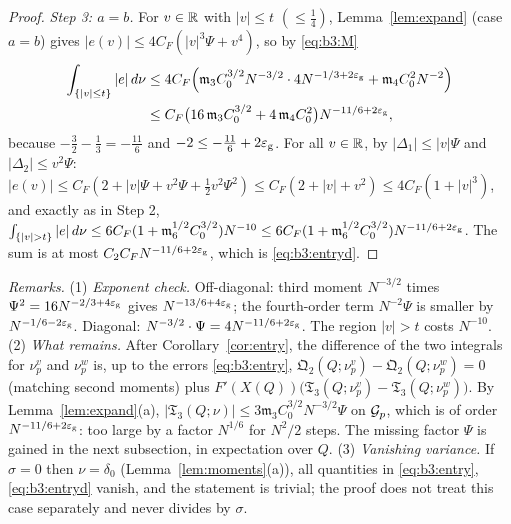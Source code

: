 \begin{proof}
\emph{Step 3: $a=b$.} For $v\in\mathbb{R}$ with $|v|\le t$ $(\le\frac14)$, Lemma~\ref{lem:expand} (case $a=b$) gives $|e(v)|\le4C_F(|v|^3\Psi+v^4)$, so by \eqref{eq:b3:M}
\begin{align*}
\int_{\{|v|\le t\}}|e|\,d\nu&\le4C_F\Big(\mathfrak m_3C_0^{3/2}N^{-3/2}\cdot4N^{-1/3+2\varepsilon_{\mathrm g}}+\mathfrak m_4C_0^2N^{-2}\Big)\\
&\le C_F\big(16\,\mathfrak m_3C_0^{3/2}+4\,\mathfrak m_4C_0^2\big)N^{-11/6+2\varepsilon_{\mathrm g}},
\end{align*}
because $-\frac32-\frac13=-\frac{11}6$ and $-2\le-\frac{11}6+2\varepsilon_{\mathrm g}$. For all $v\in\mathbb{R}$, by $|\Delta_1|\le|v|\Psi$ and $|\Delta_2|\le v^2\Psi$:
$|e(v)|\le C_F(2+|v|\Psi+v^2\Psi+\frac12v^2\Psi^2)\le C_F(2+|v|+v^2)\le4C_F(1+|v|^3)$, and exactly as in Step 2,
$\int_{\{|v|>t\}}|e|\,d\nu\le6C_F(1+\mathfrak m_6^{1/2}C_0^{3/2})N^{-10}\le6C_F(1+\mathfrak m_6^{1/2}C_0^{3/2})N^{-11/6+2\eg}$. The sum is at most $C_2C_FN^{-11/6+2\varepsilon_{\mathrm g}}$, which is \eqref{eq:b3:entryd}.
\end{proof}

\noindent\emph{Remarks.} (1) \emph{Exponent check.} Off-diagonal: third moment $N^{-3/2}$ times $\Psi^2=16N^{-2/3+4\varepsilon_{\mathrm g}}$ gives $N^{-13/6+4\varepsilon_{\mathrm g}}$; the fourth-order term $N^{-2}\Psi$
is smaller by $N^{-1/6-2\varepsilon_{\mathrm g}}$. Diagonal: $N^{-3/2}\cdot\Psi=4N^{-11/6+2\varepsilon_{\mathrm g}}$. The region $|v|>t$ costs $N^{-10}$.
(2) \emph{What remains.} After Corollary~\ref{cor:entry}, the difference of the two integrals for $\nu^v_p$ and $\nu^w_p$ is, up to the errors \eqref{eq:b3:entry},
$\mathfrak Q_2(Q;\nu^v_p)-\mathfrak Q_2(Q;\nu^w_p)=0$ (matching second moments) plus $F'(X(Q))\big(\mathfrak T_3(Q;\nu^v_p)-\mathfrak T_3(Q;\nu^w_p)\big)$. By Lemma~\ref{lem:expand}(a),
$|\mathfrak T_3(Q;\nu)|\le3\mathfrak m_3C_0^{3/2}N^{-3/2}\Psi$ on $\mathcal{G}_p$, which is of order $N^{-11/6+2\varepsilon_{\mathrm g}}$: too large by a factor $N^{1/6}$ for $N^2/2$ steps. The missing factor $\Psi$
is gained in the next subsection, in expectation over $Q$.
(3) \emph{Vanishing variance.} If $\sigma=0$ then $\nu=\delta_0$ (Lemma~\ref{lem:moments}(a)), all quantities in \eqref{eq:b3:entry}, \eqref{eq:b3:entryd} vanish, and the statement is trivial; the proof does not treat this case separately and never divides by $\sigma$.
